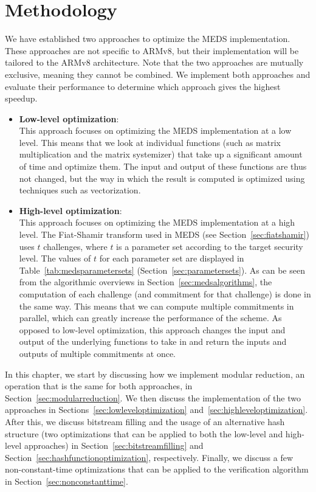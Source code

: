\documentclass[11pt,a4paper]{report}
\theoremstyle{definition}
\begin{document}
\chapter{Methodology}
\label{ch:methodology}
We have established two approaches to optimize the MEDS implementation. These approaches are not specific to ARMv8, but their implementation will be tailored to the ARMv8 architecture. Note that the two approaches are mutually exclusive, meaning they cannot be combined. We implement both approaches and evaluate their performance to determine which approach gives the highest speedup.
\begin{itemize}
  \item \textbf{Low-level optimization}:\\
        This approach focuses on optimizing the MEDS implementation at a low level. This means that we look at individual functions (such as matrix multiplication and the matrix systemizer) that take up a significant amount of time and optimize them. The input and output of these functions are thus not changed, but the way in which the result is computed is optimized using techniques such as vectorization.
  \item \textbf{High-level optimization}:\\
        This approach focuses on optimizing the MEDS implementation at a high level. The Fiat-Shamir transform used in MEDS (see Section~\ref{sec:fiatshamir}) uses $t$ challenges, where $t$ is a parameter set according to the target security level. The values of $t$ for each parameter set are displayed in Table~\ref{tab:medsparametersets} (Section~\ref{sec:parametersets}). As can be seen from the algorithmic overviews in Section~\ref{sec:medsalgorithms}, the computation of each challenge (and commitment for that challenge) is done in the same way. This means that we can compute multiple commitments in parallel, which can greatly increase the performance of the scheme. As opposed to low-level optimization, this approach changes the input and output of the underlying functions to take in and return the inputs and outputs of multiple commitments at once.
\end{itemize}

\pagebreak

In this chapter, we start by discussing how we implement modular reduction, an operation that is the same for both approaches, in Section~\ref{sec:modularreduction}. We then discuss the implementation of the two approaches in Sections~\ref{sec:lowleveloptimization} and~\ref{sec:highleveloptimization}. After this, we discuss bitstream filling and the usage of an alternative hash structure (two optimizations that can be applied to both the low-level and high-level approaches) in Section~\ref{sec:bitstreamfilling} and Section~\ref{sec:hashfunctionoptimization}, respectively. Finally, we discuss a few non-constant-time optimizations that can be applied to the verification algorithm in Section~\ref{sec:nonconstanttime}.
\end{document}
